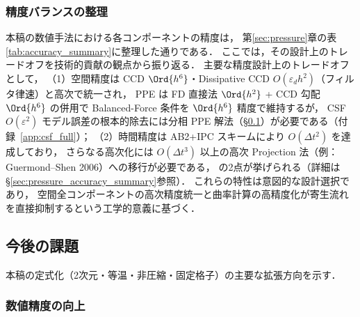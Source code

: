 \subsubsection{精度バランスの整理}

本稿の数値手法における各コンポーネントの精度は，
第\ref{sec:pressure}章の表\ref{tab:accuracy_summary}に整理した通りである．
ここでは，その設計上のトレードオフを技術的貢献の観点から振り返る．
主要な精度設計上のトレードオフとして，
（1）空間精度は CCD $\Ord{h^6}$・Dissipative CCD $O(\varepsilon_d h^2)$（フィルタ律速）と高次で統一され，
PPE は FD 直接法 $\Ord{h^2}$ + CCD 勾配 $\Ord{h^6}$ の併用で
Balanced-Force 条件を $\Ord{h^6}$ 精度で維持するが，
CSF $O(\varepsilon^2)$ モデル誤差の根本的除去には分相 PPE 解法（§\ref{sec:future_work}）が必要である（付録~\ref{app:csf_full}）；
（2）時間精度は AB2+IPC スキームにより $O(\Delta t^2)$ を達成しており，
さらなる高次化には $O(\Delta t^3)$ 以上の高次 Projection 法（例：Guermond--Shen 2006）への移行が必要である，
の2点が挙げられる（詳細は§\ref{sec:pressure_accuracy_summary}参照）．
これらの特性は意図的な設計選択であり，
空間全コンポーネントの高次精度統一と曲率計算の高精度化が寄生流れを直接抑制するという工学的意義に基づく．

\subsection{今後の課題}
\label{sec:future_work}

本稿の定式化（2次元・等温・非圧縮・固定格子）の主要な拡張方向を示す．

\subsubsection{数値精度の向上}

